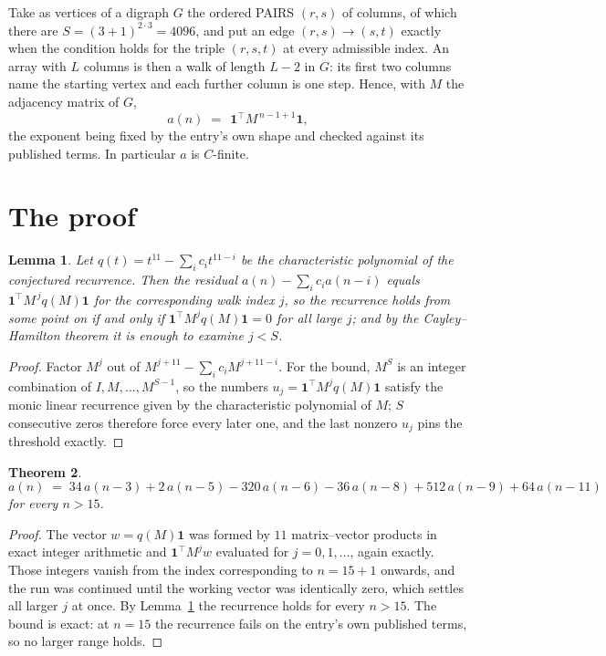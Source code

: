 \documentclass[11pt,a4paper]{article}
\theoremstyle{plain}
\newtheorem{theorem}{Theorem}
\newtheorem{lemma}[theorem]{Lemma}
\theoremstyle{definition}
\begin{document}
Take as vertices of a digraph $G$ the ordered PAIRS $(r,s)$ of columns, of which there are
$S=(3+1)^{2\cdot3}=4096$, and put an edge $(r,s)\to(s,t)$ exactly when the condition
holds for the triple $(r,s,t)$ at every admissible index. An array with $L$ columns is then a
walk of length $L-2$ in $G$: its first two columns name the starting vertex and each further
column is one step. Hence, with $M$ the adjacency matrix of $G$,
\[
a(n)\;=\;\,\mathbf{1}^{\!\top}M^{\,n-1+1}\mathbf{1},
\]
the exponent being fixed by the entry's own shape and checked against its published terms.
In particular $a$ is $C$-finite.

\section{The proof}

\begin{lemma}\label{lem:crit}
Let $q(t)=t^{11}-\sum_i c_it^{11-i}$ be the characteristic polynomial of the
conjectured recurrence. Then the residual $a(n)-\sum_ic_ia(n-i)$ equals
$\mathbf{1}^{\!\top}M^{\,j}q(M)\mathbf{1}$ for the corresponding walk index
$j$, so the recurrence holds from some point on if and only if
$\mathbf{1}^{\!\top}M^{j}q(M)\mathbf{1}=0$ for all large $j$; and by the
Cayley--Hamilton theorem it is enough to examine $j<S$.
\end{lemma}

\begin{proof}
Factor $M^{j}$ out of $M^{j+11}-\sum_ic_iM^{j+11-i}$. For the bound, $M^{S}$
is an integer combination of $I,M,\dots,M^{S-1}$, so the numbers
$u_j=\mathbf{1}^{\!\top}M^{j}q(M)\mathbf{1}$ satisfy the monic linear recurrence given by
the characteristic polynomial of $M$; $S$ consecutive zeros therefore force every later one,
and the last nonzero $u_j$ pins the threshold exactly.
\end{proof}

\begin{theorem}
\[
a(n)\;=\;34\,a(n-3) + 2\,a(n-5) - 320\,a(n-6) - 36\,a(n-8) + 512\,a(n-9) + 64\,a(n-11)
\]
for every $n>15$.
\end{theorem}

\begin{proof}
The vector $w=q(M)\mathbf{1}$ was formed by $11$ matrix--vector products in exact
integer arithmetic and $\mathbf{1}^{\!\top}M^{j}w$ evaluated for $j=0,1,\dots$, again
exactly. Those integers vanish from the index corresponding to $n=15+1$ onwards, and the
run was continued until the working vector was identically zero, which settles all larger $j$
at once. By Lemma~\ref{lem:crit} the recurrence holds for every $n>15$. The bound is exact: at $n=15$ the recurrence fails on the entry's own published terms, so no larger range holds.
\end{proof}
\end{document}
